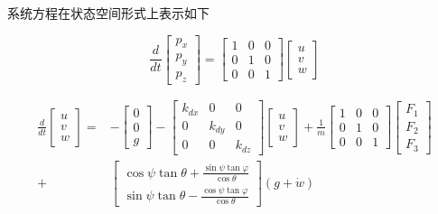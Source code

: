 系统方程在状态空间形式上表示如下

\begin{equation}
\frac{d}{d t}\left[\begin{array}{l}
p_{x} \\
p_{y} \\
p_{z}
\end{array}\right]=\left[\begin{array}{lll}
1 & 0 & 0 \\
0 & 1 & 0 \\
0 & 0 & 1
\end{array}\right]\left[\begin{array}{c}
u \\
v \\
w
\end{array}\right]
\end{equation}

\begin{equation}
\begin{aligned}
\frac{d}{d t}\left[\begin{array}{c}
u \\
v \\
w
\end{array}\right]=&-\left[\begin{array}{l}
0 \\
0 \\
g
\end{array}\right]-\left[\begin{array}{ccc}
k_{d x} & 0 & 0 \\
0 & k_{d y} & 0 \\
0 & 0 & k_{d z}
\end{array}\right]\left[\begin{array}{c}
u \\
v \\
w
\end{array}\right]+\frac{1}{m}\left[\begin{array}{lll}
1 & 0 & 0 \\
0 & 1 & 0 \\
0 & 0 & 1
\end{array}\right]\left[\begin{array}{l}
F_{1} \\
F_{2} \\
F_{3}
\end{array}\right] \\
+& {\left[\begin{array}{c}
\cos \psi \tan \theta+\frac{\sin \psi \tan \varphi}{\cos \theta} \\
\sin \psi \tan \theta-\frac{\cos \psi \tan \varphi}{\cos \theta}
\end{array}\right](g+\dot{w}) }
\end{aligned}
\end{equation}

